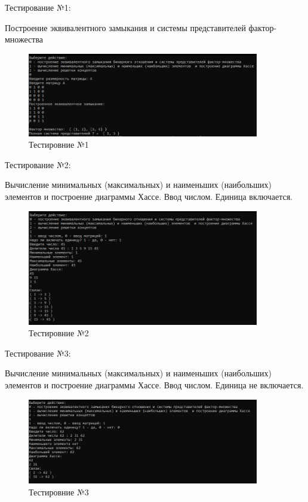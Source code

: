 \documentclass[bachelor, och, labwork]{shiza}
\begin{document}
	Тестирование №1:
	
	Построение эквивалентного замыкания и системы представителей фактор-множества

	\begin{figure}[H]
		\centering
		\includegraphics[width=0.9\textwidth]{test_1}
		\caption{Тестировние №1}
		\label{fig:test_1}
	\end{figure}
	
	Тестирование №2:
	
	Вычисление минимальных (максимальных) и наименьших (наибольших) элементов  и построение диаграммы Хассе. Ввод числом. Единица включается.
	
	\begin{figure}[H]
		\centering
		\includegraphics[width=0.9\textwidth]{test_2}
		\caption{Тестировние №2}
		\label{fig:test_2}
	\end{figure}
	
	Тестирование №3:

	Вычисление минимальных (максимальных) и наименьших (наибольших) элементов  и построение диаграммы Хассе. Ввод числом. Единица не включается.

	
	\begin{figure}[H]
		\centering
		\includegraphics[width=0.9\textwidth]{test_3}
		\caption{Тестировние №3}
		\label{fig:test_3}
	\end{figure}
\end{document}
